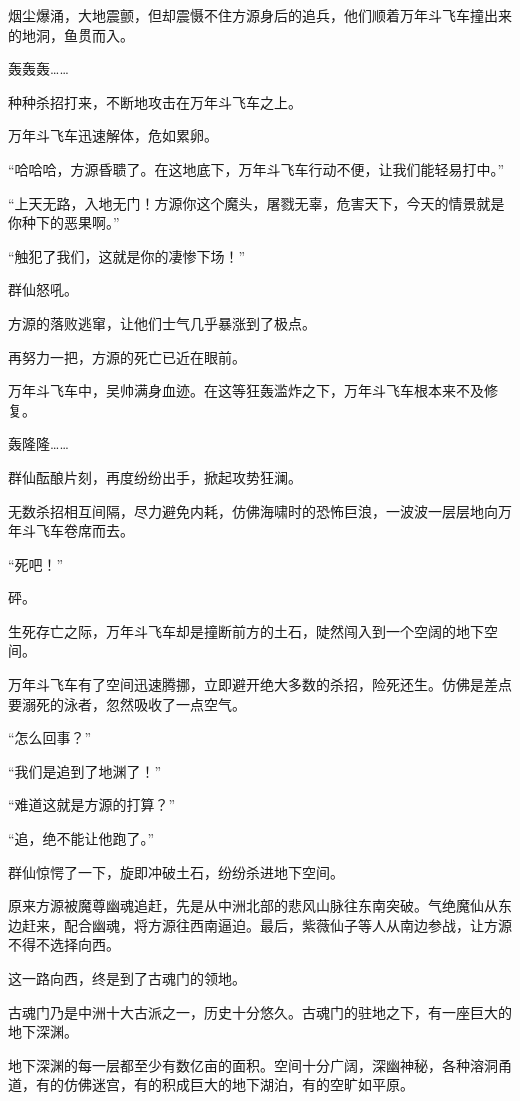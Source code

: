 \begin{this_body}
烟尘爆涌，大地震颤，但却震慑不住方源身后的追兵，他们顺着万年斗飞车撞出来的地洞，鱼贯而入。

轰轰轰……

种种杀招打来，不断地攻击在万年斗飞车之上。

万年斗飞车迅速解体，危如累卵。

“哈哈哈，方源昏聩了。在这地底下，万年斗飞车行动不便，让我们能轻易打中。”

“上天无路，入地无门！方源你这个魔头，屠戮无辜，危害天下，今天的情景就是你种下的恶果啊。”

“触犯了我们，这就是你的凄惨下场！”

群仙怒吼。

方源的落败逃窜，让他们士气几乎暴涨到了极点。

再努力一把，方源的死亡已近在眼前。

万年斗飞车中，吴帅满身血迹。在这等狂轰滥炸之下，万年斗飞车根本来不及修复。

轰隆隆……

群仙酝酿片刻，再度纷纷出手，掀起攻势狂澜。

无数杀招相互间隔，尽力避免内耗，仿佛海啸时的恐怖巨浪，一波波一层层地向万年斗飞车卷席而去。

“死吧！”

砰。

生死存亡之际，万年斗飞车却是撞断前方的土石，陡然闯入到一个空阔的地下空间。

万年斗飞车有了空间迅速腾挪，立即避开绝大多数的杀招，险死还生。仿佛是差点要溺死的泳者，忽然吸收了一点空气。

“怎么回事？”

“我们是追到了地渊了！”

“难道这就是方源的打算？”

“追，绝不能让他跑了。”

群仙惊愕了一下，旋即冲破土石，纷纷杀进地下空间。

原来方源被魔尊幽魂追赶，先是从中洲北部的悲风山脉往东南突破。气绝魔仙从东边赶来，配合幽魂，将方源往西南逼迫。最后，紫薇仙子等人从南边参战，让方源不得不选择向西。

这一路向西，终是到了古魂门的领地。

古魂门乃是中洲十大古派之一，历史十分悠久。古魂门的驻地之下，有一座巨大的地下深渊。

地下深渊的每一层都至少有数亿亩的面积。空间十分广阔，深幽神秘，各种溶洞甬道，有的仿佛迷宫，有的积成巨大的地下湖泊，有的空旷如平原。


\end{this_body}
